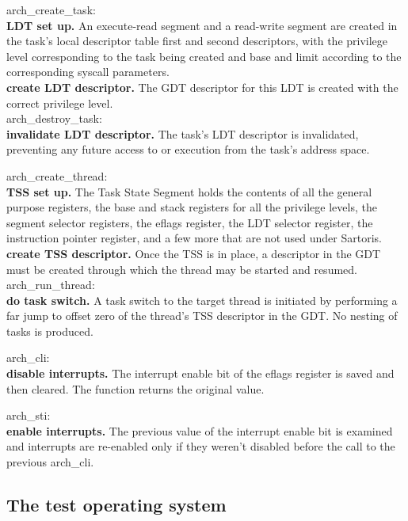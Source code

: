 \documentclass[12pt, letterpaper, oneside, english]{article}
\begin{document}
\textsf{arch\_create\_task}: \\
\textbf{LDT set up.} An execute-read segment and a read-write segment are created in the task's local descriptor table first and second descriptors, with the privilege level corresponding to the task being created and base and limit according to the corresponding syscall parameters. \\
\textbf{create LDT descriptor.} The GDT descriptor for this LDT is created with the correct privilege level. \\

\textsf{arch\_destroy\_task}: \\
\textbf{invalidate LDT descriptor.} The task's LDT descriptor is invalidated, preventing any future access to or execution from the task's address space.


\textsf{arch\_create\_thread}: \\
\textbf{TSS set up.} The Task State Segment holds the contents of all the general purpose registers, the base and stack registers for all the privilege levels, the segment selector registers, the eflags register, the LDT selector register, the instruction pointer register, and a few more that are not used under Sartoris. \\
\textbf{create TSS descriptor.} Once the TSS is in place, a descriptor in the GDT must be created through which the thread may be started and resumed. \\

\textsf{arch\_run\_thread}: \\
\textbf{do task switch.} A task switch to the target thread is initiated by performing a far jump to offset zero of the thread's TSS descriptor in the GDT. No nesting of tasks is produced.

\textsf{arch\_cli}: \\
\textbf{disable interrupts.} The interrupt enable bit of the eflags register is saved and then cleared. The function returns the original value.

\textsf{arch\_sti}: \\
\textbf{enable interrupts.} The previous value of the interrupt enable bit is examined and interrupts are re-enabled only if they weren't disabled before the call to the previous \textsf{arch\_cli}.

\subsection{The test operating system}
\end{document}
